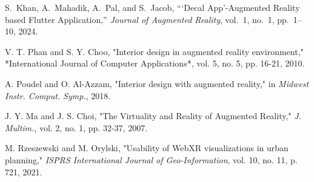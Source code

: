 \documentclass[conference]{IEEEtran}
\begin{document}
\begin{thebibliography}{00}
  S.~Khan, A.~Mahadik, A.~Pal, and S.~Jacob, ``‘Decal App’-Augmented Reality based Flutter Application,'' \emph{Journal of Augmented Reality}, vol.~1, no.~1, pp.~1--10, 2024.

  V. T. Phan and S. Y. Choo, "Interior design in augmented reality environment," *International Journal of Computer Applications*, vol. 5, no. 5, pp. 16-21, 2010.

  A. Poudel and O. Al-Azzam, "Interior design with augmented reality," in \textit{Midwest Instr. Comput. Symp.}, 2018.

  J. Y. Ma and J. S. Choi, "The Virtuality and Reality of Augmented Reality," \textit{J. Multim.}, vol. 2, no. 1, pp. 32-37, 2007.

  M. Rzeszewski and M. Orylski, "Usability of WebXR visualizations in urban planning," \textit{ISPRS International Journal of Geo-Information}, vol. 10, no. 11, p. 721, 2021.
\end{thebibliography}
\end{document}
